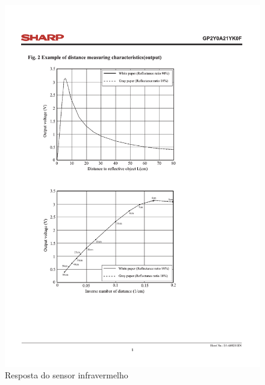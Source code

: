 \begin{figure}[ht]
	\centering
	\caption{Resposta do sensor infravermelho}
	\label{fig:SensorIR}
	
	\includegraphics[trim= 3cm 15.8cm 6.5cm 4.8cm,clip,
scale=1]{Figuras/IR_Datasheet_Figure}

	
		
	
	

\end{figure}
